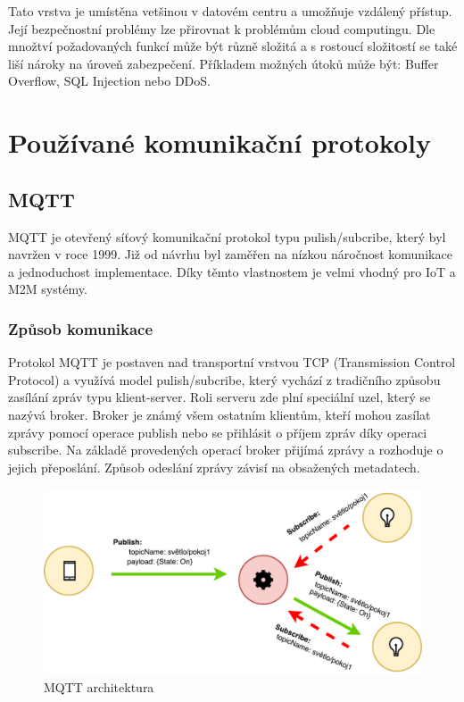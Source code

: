  Tato vrstva je umístěna vetšinou v datovém centru a umožňuje vzdálený přístup. 
 Její bezpečnostní problémy lze přirovnat k problémům cloud computingu. Dle
 množtví požadovaných funkcí může být různě složitá a s rostoucí složitostí
 se také liší nároky na úroveň zabezpečení. Příkladem možných útoků může být:
 Buffer Overflow, SQL Injection nebo DDoS.
 
 \section{Používané komunikační protokoly} \label{protokoly}
  \subsection{MQTT}
  MQTT je otevřený síťový komunikační protokol typu pulish/subcribe, který byl navržen
  v roce 1999. Již od návrhu byl zaměřen na nízkou náročnost komunikace a jednoduchost
  implementace. Díky těmto vlastnostem je velmi vhodný pro IoT a M2M systémy. \cite{mqtt}
  \subsubsection{Způsob komunikace}
  
  Protokol MQTT je postaven nad transportní vrstvou TCP (Transmission Control Protocol)
  a využívá model pulish/subcribe, který vychází z tradičního způsobu zasílání zpráv
  typu klient-server. Roli serveru zde plní speciální uzel, který se nazývá broker.
  Broker je známý všem ostatním klientům, kteří mohou zasílat zprávy pomocí operace
  publish nebo se přihlásit o příjem zpráv díky operaci subscribe.
  Na základě provedených operací broker přijímá zprávy a rozhoduje o jejich přeposlání.
  Způsob odeslání zprávy závisí na obsažených metadatech.
  
\begin{figure}[ht]
\begin{center}
\includegraphics[scale=0.38]{pictures/mqtt}
\caption{MQTT architektura}
\label{obr.mqtt-arch}
\end{center}
\end{figure}
  
